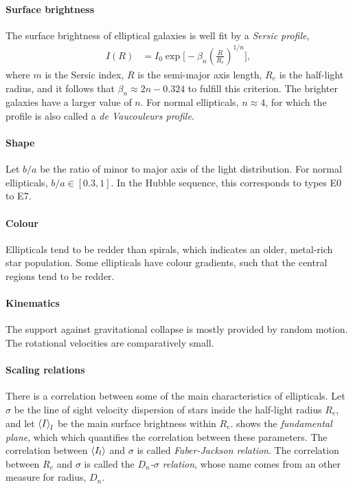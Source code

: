 \paragraph*{Surface brightness}
The surface brightness of elliptical galaxies is well fit by a \emph{Sersic profile},
\begin{align*}
	I(R)
	&= I_0 \exp\Bigg[ - \beta_n \left( \frac{R}{R_e}  \right)^{1/n} \Bigg],
\end{align*}
where $m$ is the Sersic index,
$R$ is the semi-major axis length,
$R_e$ is the half-light radius,
and it follows that $\beta_n \approx 2 n - 0.324$ to fulfill this criterion.
The brighter galaxies have a larger value of $n$.
For normal ellipticals, $n \approx 4$, for which the profile is also called a \emph{de Vaucouleurs profile}.

\paragraph*{Shape}
Let $b/a$ be the ratio of minor to major axis of the light distribution.
For normal ellipticals, $b/a \in [0.3, 1]$.
In the Hubble sequence, this corresponds to types E0 to E7.

\paragraph*{Colour}
Ellipticals tend to be redder than spirals, which indicates an older, metal-rich star population.
Some ellipticals have colour gradients, such that the central regions tend to be redder.

\paragraph*{Kinematics}
The support against gravitational collapse is mostly provided by random motion.
The rotational velocities are comparatively small.


\paragraph{Scaling relations}
There is a correlation between some of the main characteristics of ellipticals.
Let $\sigma$ be the line of sight velocity dispersion of stars inside the half-light radius $R_e$,
and let $\left\langle I \right\rangle_l$ be the main surface brightness within $R_e$.
 shows the \emph{fundamental plane}, which which quantifies the correlation between these parameters.
The correlation between $\left\langle I_l \right\rangle$ and $\sigma$ is called \emph{Faber-Jackson relation}.
The correlation between $R_e$ and $\sigma$ is called the \emph{$D_n$-$\sigma$ relation}, whose name comes from an other measure for radius, $D_n$.


